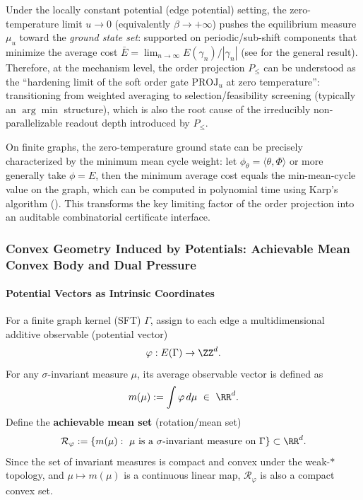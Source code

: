 \begin{remark}\label{rem:pom-order-as-zero-temp}
Under the locally constant potential (edge potential) setting, the zero-temperature limit $u\to 0$ (equivalently $\beta\to+\infty$) pushes the equilibrium measure $\mu_u$ toward the \emph{ground state set}: supported on periodic/sub-shift components that minimize the average cost $\bar E=\lim_{n\to\infty}E(\gamma_n)/|\gamma_n|$ (see \cite{ChazottesGambaudoUgalde2011ZeroTempLocConst} for the general result). Therefore, at the mechanism level, the order projection $P_{\le}$ can be understood as the ``hardening limit of the soft order gate $\mathrm{PROJ}_u$ at zero temperature'': transitioning from weighted averaging to selection/feasibility screening (typically an $\arg\min$ structure), which is also the root cause of the irreducibly non-parallelizable readout depth introduced by $P_{\le}$.

On finite graphs, the zero-temperature ground state can be precisely characterized by the minimum mean cycle weight: let $\phi_\theta=\langle\theta,\Phi\rangle$ or more generally take $\phi=E$, then the minimum average cost equals the min-mean-cycle value on the graph, which can be computed in polynomial time using Karp's algorithm (\cite{Karp1978MinCycleMean}). This transforms the key limiting factor of the order projection into an auditable combinatorial certificate interface.
\end{remark}

\subsubsection{Convex Geometry Induced by Potentials: Achievable Mean Convex Body and Dual Pressure}\label{subsec:pom-potential-convex-geometry}
\paragraph{Potential Vectors as Intrinsic Coordinates}
For a finite graph kernel (SFT) \(\Gamma\), assign to each edge a multidimensional additive observable (potential vector)
$$
\varphi:E(\Gamma)\to \ZZ^d.
$$
For any \(\sigma\)-invariant measure \(\mu\), its average observable vector is defined as
$$
m(\mu):=\int \varphi\,d\mu\ \in\ \RR^d.
$$
Define the \textbf{achievable mean set} (rotation/mean set)
$$
\mathcal{R}_\varphi:=\{m(\mu):\ \mu\ \text{is a}\ \sigma\text{-invariant measure on}\ \Gamma\}\subset\RR^d.
$$
Since the set of invariant measures is compact and convex under the weak-\(\ast\) topology, and \(\mu\mapsto m(\mu)\) is a continuous linear map, \(\mathcal{R}_\varphi\) is also a compact convex set.

